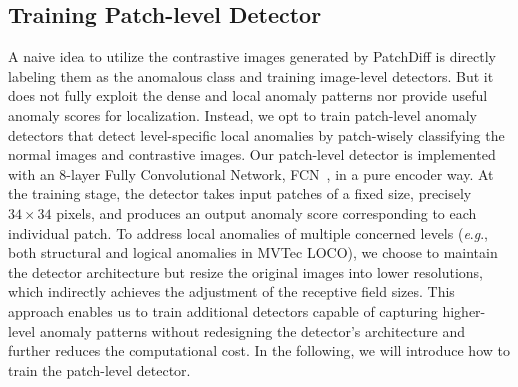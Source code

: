\documentclass[letterpaper]{article} %
\newcommand{\eg}{\textit{e}.\textit{g}.}
\begin{document}
\subsection{Training Patch-level Detector}
\label{sec: training}
A naive idea to utilize the contrastive images generated by PatchDiff is directly labeling them as the anomalous class and training image-level detectors. But it does not fully exploit the dense and local anomaly patterns nor provide useful anomaly scores for localization. Instead, we opt to train patch-level anomaly detectors that detect level-specific local anomalies by patch-wisely classifying the normal images and contrastive images.
Our patch-level detector is implemented with an 8-layer Fully Convolutional Network, FCN~\cite{FCN}, in a pure encoder way. At the training stage, the detector takes input patches of a fixed size, precisely $34 \times 34$ pixels, and produces an output anomaly score corresponding to each individual patch. To address local anomalies of multiple concerned levels (\eg, both structural and logical anomalies in MVTec LOCO), we choose to maintain the detector architecture but resize the original images into lower resolutions, which indirectly achieves the adjustment of the receptive field sizes. This approach enables us to train additional detectors capable of capturing higher-level anomaly patterns without redesigning the detector's architecture and further reduces the computational cost. In the following, we will introduce how to train the patch-level detector.
\end{document}
